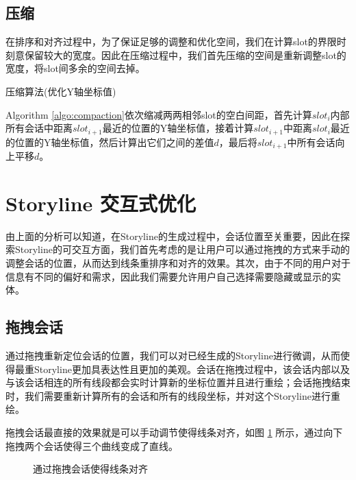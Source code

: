 \subsection{压缩} 
在排序和对齐过程中，为了保证足够的调整和优化空间，我们在计算slot的界限时刻意保留较大的宽度。因此在压缩过程中，我们首先压缩的空间是重新调整slot的宽度，将slot间多余的空间去掉。
\begin{algorithm}[!htb]
  \caption{压缩算法(优化Y轴坐标值)}
  \label{algo:compaction}
\end{algorithm}
Algorithm \ref{algo:compaction}依次缩减两两相邻slot的空白间距，首先计算$slot_i$内部所有会话中距离$slot_{i+1}$最近的位置的Y轴坐标值，接着计算$slot_{i+1}$中距离$slot_i$最近的位置的Y轴坐标值，然后计算出它们之间的差值$d$，最后将$slot_{i+1}$中所有会话向上平移$d$。

\section{Storyline 交互式优化}
由上面的分析可以知道，在Storyline的生成过程中，会话位置至关重要，因此在探索Storyline的可交互方面，我们首先考虑的是让用户可以通过拖拽的方式来手动的调整会话的位置，从而达到线条重排序和对齐的效果。其次，由于不同的用户对于信息有不同的偏好和需求，因此我们需要允许用户自己选择需要隐藏或显示的实体。
\subsection{拖拽会话}
通过拖拽重新定位会话的位置，我们可以对已经生成的Storyline进行微调，从而使得最重Storyline更加具表达性且更加的美观。会话在拖拽过程中，该会话内部以及与该会话相连的所有线段都会实时计算新的坐标位置并且进行重绘；会话拖拽结束时，我们需要重新计算所有的会话和所有的线段坐标，并对这个Storyline进行重绘。

拖拽会话最直接的效果就是可以手动调节使得线条对齐，如图 \ref{fig:drag-to-realignment} 所示，通过向下拖拽两个会话使得三个曲线变成了直线。
\begin{figure}[htb]
    \centering
    \caption{通过拖拽会话使得线条对齐}
    \label{fig:drag-to-realignment}
\end{figure}

